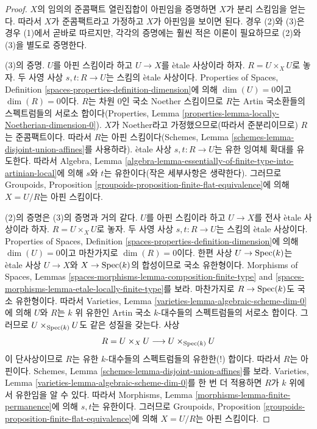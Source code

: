 \begin{proof}
$X$의 임의의 준콤팩트 열린집합이 아핀임을 증명하면 $X$가 분리
스킴임을 얻는다. 따라서 $X$가 준콤팩트라고 가정하고 $X$가 아핀임을
보이면 된다. 경우 (2)와 (3)은 경우 (1)에서 곧바로 따르지만, 각각의
증명에는 훨씬 적은 이론이 필요하므로 (2)와 (3)을 별도로 증명한다.

\medskip\noindent
(3)의 증명. $U$를 아핀 스킴이라 하고 $U \to X$를 \`etale 사상이라
하자. $R = U \times_X U$로 놓자. 두 사영 사상 $s, t : R \to U$는
스킴의 \`etale 사상이다. Properties of Spaces, Definition
\ref{spaces-properties-definition-dimension}에 의해
$\dim(U) = 0$이고 $\dim(R) = 0$이다. $R$는 차원 $0$인 국소 Noether
스킴이므로 $R$는 Artin 국소환들의 스펙트럼들의 서로소 합이다(Properties,
Lemma \ref{properties-lemma-locally-Noetherian-dimension-0}). $X$가
Noether라고 가정했으므로(따라서 준분리이므로) $R$는 준콤팩트이다.
따라서 $R$는 아핀 스킴이다(Schemes, Lemma
\ref{schemes-lemma-disjoint-union-affines}를 사용하라). \`etale 사상
$s, t : R \to U$는 유한 잉여체 확대를 유도한다. 따라서 Algebra,
Lemma \ref{algebra-lemma-essentially-of-finite-type-into-artinian-local}에
의해 $s$와 $t$는 유한이다(작은 세부사항은 생략한다). 그러므로
Groupoids, Proposition \ref{groupoids-proposition-finite-flat-equivalence}에
의해 $X = U/R$는 아핀 스킴이다.

\medskip\noindent
(2)의 증명은 (3)의 증명과 거의 같다. $U$를 아핀 스킴이라 하고
$U \to X$를 전사 \`etale 사상이라 하자. $R = U \times_X U$로 놓자.
두 사영 사상 $s, t : R \to U$는 스킴의 \`etale 사상이다. Properties
of Spaces, Definition \ref{spaces-properties-definition-dimension}에 의해
$\dim(U) = 0$이고 마찬가지로 $\dim(R) = 0$이다. 한편 사상
$U \to \mathop{\mathrm{Spec}}(k)$는 \`etale 사상 $U \to X$와 $X \to \mathop{\mathrm{Spec}}(k)$의
합성이므로 국소 유한형이다. Morphisms of Spaces, Lemmas
\ref{spaces-morphisms-lemma-composition-finite-type} and
\ref{spaces-morphisms-lemma-etale-locally-finite-type}를 보라. 마찬가지로
$R \to \mathop{\mathrm{Spec}}(k)$도 국소 유한형이다. 따라서 Varieties, Lemma
\ref{varieties-lemma-algebraic-scheme-dim-0}에 의해 $U$와 $R$는 $k$ 위
유한인 Artin 국소 $k$-대수들의 스펙트럼들의 서로소 합이다. 그러므로
$U \times_{\mathop{\mathrm{Spec}}(k)} U$도 같은 성질을 갖는다. 사상
$$
R = U \times_X U \longrightarrow U \times_{\mathop{\mathrm{Spec}}(k)} U
$$
이 단사상이므로 $R$는 유한 $k$-대수들의 스펙트럼들의 유한한(!) 합이다.
따라서 $R$는 아핀이다. Schemes, Lemma
\ref{schemes-lemma-disjoint-union-affines}를 보라. Varieties, Lemma
\ref{varieties-lemma-algebraic-scheme-dim-0}를 한 번 더 적용하면 $R$가
$k$ 위에서 유한임을 알 수 있다. 따라서 Morphisms, Lemma
\ref{morphisms-lemma-finite-permanence}에 의해 $s, t$는 유한이다.
그러므로 Groupoids, Proposition
\ref{groupoids-proposition-finite-flat-equivalence}에 의해 $X = U/R$는
아핀 스킴이다.


\end{proof}
